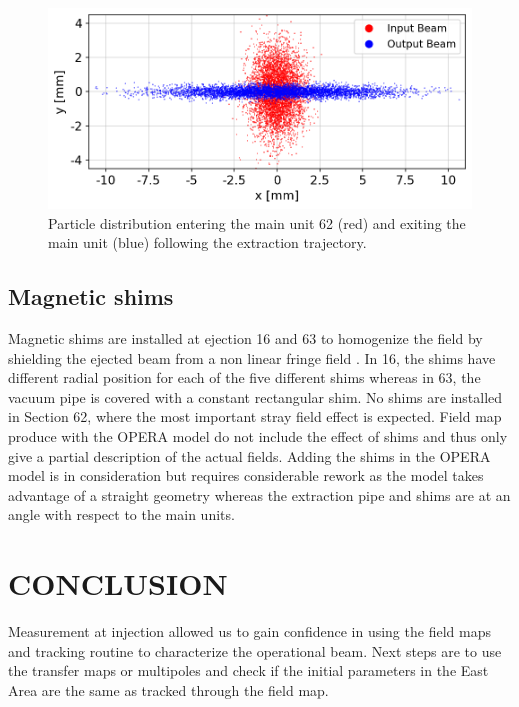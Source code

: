 \documentclass[a4paper,
               biblatex,     %
               keeplastbox,   %
               ]{jacow}
\begin{document}
\begin{figure}[!htb]
   \centering
   \includegraphics*[width=1.0\columnwidth]{particle_distribution.png}
   \caption{Particle distribution entering the main unit 62 (red) and exiting the main unit (blue) following the extraction trajectory.}
   \label{fig:particle_distribution}
\end{figure}

\subsection{Magnetic shims}

Magnetic shims are installed at ejection 16 and 63 to homogenize the field by shielding the ejected beam from a non linear fringe field \cite{zickler_influence_nodate}. In 16, the shims have different radial position for each of the five different shims whereas in 63, the vacuum pipe is covered with a constant rectangular shim. No shims are installed in Section 62, where the most important stray field effect is expected. Field map produce with the OPERA model do not include the effect of shims and thus only give a partial description of the actual fields. Adding the shims in the OPERA model is in consideration but requires considerable rework as the model takes advantage of a straight geometry whereas the extraction pipe and shims are at an angle with respect to the main units.


\section{CONCLUSION}
Measurement at injection allowed us to gain confidence in using the field maps and tracking routine to characterize the operational beam. Next steps are to use the transfer maps or multipoles and check if the initial parameters in the East Area are the same as tracked through the field map.

\printbibliography
\end{document}
